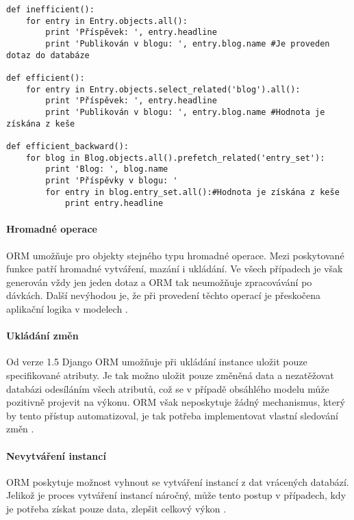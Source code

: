 \documentclass[ing,male,java,dept456]{diploma}						%
\begin{document}
\begin{lstlisting}[style=custompython, label=src:Nplus1, caption={N+1 problém a jeho řešení}]
def inefficient():
	for entry in Entry.objects.all():
		print 'Příspěvek: ', entry.headline
		print 'Publikován v blogu: ', entry.blog.name #Je proveden dotaz do databáze
		
def efficient():
	for entry in Entry.objects.select_related('blog').all():
		print 'Příspěvek: ', entry.headline
		print 'Publikován v blogu: ', entry.blog.name #Hodnota je získána z keše
		
def efficient_backward():
	for blog in Blog.objects.all().prefetch_related('entry_set'):
		print 'Blog: ', blog.name
		print 'Příspěvky v blogu: '
		for entry in blog.entry_set.all():#Hodnota je získána z keše
			print entry.headline
\end{lstlisting}

\paragraph{Hromadné operace}

ORM umožňuje pro objekty stejného typu hromadné operace. Mezi poskytované funkce patří hromadné vytváření, mazání i ukládání. Ve všech případech je však generován vždy jen jeden dotaz a ORM tak neumožňuje zpracovávání po dávkách. Další nevýhodou je, že při provedení těchto operací je přeskočena aplikační logika v modelech \cite{dj-bulk}.

\paragraph{Ukládání změn} Od verze 1.5 Django ORM umožňuje při ukládání instance uložit pouze specifikované atributy. Je tak možno uložit pouze změněná data a nezatěžovat databázi odesíláním všech atributů, což se v případě obsáhlého modelu může pozitivně projevit na výkonu. ORM však neposkytuje žádný mechanismus, který by tento přístup automatizoval, je tak potřeba implementovat vlastní sledování změn \cite{dj-save}.

\paragraph{Nevytváření instancí} ORM poskytuje možnost vyhnout se vytváření instancí z dat vrácených databází. Jelikož je proces vytváření instancí náročný, může tento postup v případech, kdy je potřeba získat pouze data, zlepšit celkový výkon \cite{dj-values}.
\end{document}
